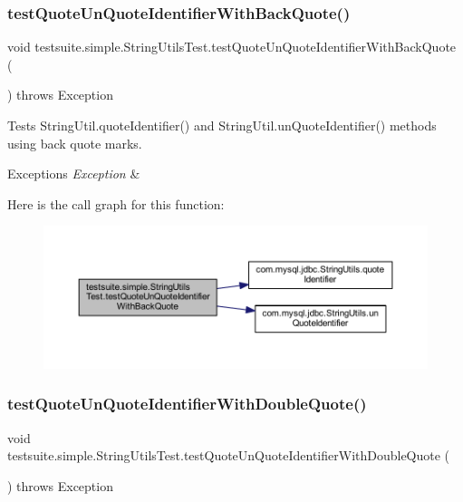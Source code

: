 \subsubsection{\texorpdfstring{test\+Quote\+Un\+Quote\+Identifier\+With\+Back\+Quote()}{testQuoteUnQuoteIdentifierWithBackQuote()}}
{\footnotesize\ttfamily void testsuite.\+simple.\+String\+Utils\+Test.\+test\+Quote\+Un\+Quote\+Identifier\+With\+Back\+Quote (\begin{DoxyParamCaption}{ }\end{DoxyParamCaption}) throws Exception}

Tests String\+Util.\+quote\+Identifier() and String\+Util.\+un\+Quote\+Identifier() methods using back quote marks.


\begin{DoxyExceptions}{Exceptions}
{\em Exception} & \\
\hline
\end{DoxyExceptions}
Here is the call graph for this function\+:
\nopagebreak
\begin{figure}[H]
\begin{center}
\leavevmode
\includegraphics[width=350pt]{classtestsuite_1_1simple_1_1_string_utils_test_a674e096dd56440c0872b382f87edd909_cgraph}
\end{center}
\end{figure}
\mbox{\label{classtestsuite_1_1simple_1_1_string_utils_test_adb8f4c412143b740afd9fe6c70018660}} 
\subsubsection{\texorpdfstring{test\+Quote\+Un\+Quote\+Identifier\+With\+Double\+Quote()}{testQuoteUnQuoteIdentifierWithDoubleQuote()}}
{\footnotesize\ttfamily void testsuite.\+simple.\+String\+Utils\+Test.\+test\+Quote\+Un\+Quote\+Identifier\+With\+Double\+Quote (\begin{DoxyParamCaption}{ }\end{DoxyParamCaption}) throws Exception}

